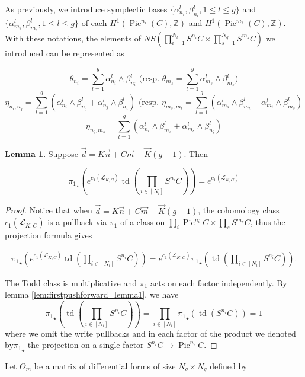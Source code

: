 \documentclass{article}
\theoremstyle{definition}
\newcounter{sharedcounter}[section]
\newtheorem{lemma}[sharedcounter]{Lemma}
\DeclareMathOperator{\pic}{\text{Pic}}
\DeclareMathOperator{\td}{td}
\newcommand{\eqtag}[3][1]{
\begin{equation}
   \label{#3}
	\begin{alignedat}{#1}
	#2
	\end{alignedat}
\end{equation}
}
\renewcommand{\leq}{\leqslant}
\begin{document}
\label{sec:symplectic-basis}
	
    As previously, we introduce symplectic bases $\lbrace \alpha_{n_i}^l,\beta_{n_i}^l,1\leq l\leq g \rbrace$ and $\lbrace {\alpha}_{m_s}^l,{\beta}_{m_s}^l,1\leq l\leq g \rbrace$ of each $H^1(\pic^{n_i}(C),\mathbb{Z})$ and $H^1(\pic^{m_s}(C),\mathbb{Z})$. With these notations, the elements of $NS( \prod_{i=1}^{N_l} S^{n_i} C \times\prod_{s=1}^{N_q} S^{m_s}C)$ we introduced can be represented as

    $$\theta_{n_i}=\sum_{l=1}^g \alpha_{n_i}^l \wedge \beta_{n_i}^l \text{ (resp. }\theta_{m_s}=\sum_{l=1}^g {\alpha}_{m_s}^l \wedge \beta_{m_s}^l)$$
	$$\eta_{n_i,n_j}=\sum_{l=1}^g (\alpha_{n_i}^l \wedge\beta_{n_j}^l +\alpha_{n_j}^l \wedge\beta_{n_i}^l) \text{ (resp. } \eta_{m_s,m_t}=\sum_{l=1}^g ({\alpha}_{m_s}^l \wedge {\beta}_{m_t}^l +{\alpha}_{m_t}^l \wedge {\beta}_{m_s}^l)$$
 	$$\eta_{n_i,m_s}=\sum_{l=1}^g (\alpha_{n_i}^l \wedge {\beta}_{m_s}^l +{\alpha}_{m_s}^l \wedge\beta_{n_i}^l)$$

\begin{lemma}
Suppose $\vec{d}=K\vec{n}+C\vec{m}+\vec{K}(g-1)$. Then 

$${\pi_1}_\star \left(e^{c_1(\mathcal{L}_{K,C})} \td\left(\prod_{i\in [{N_l}]} S^{n_i}C \right)\right)=e^{c_1(\mathcal{L}_{K,C})}$$
    
\end{lemma}

\begin{proof}
Notice that when $\vec{d}=K\vec{n}+C\vec{m}+\vec{K}(g-1)$, the cohomology class $c_1(\mathcal{L}_{K,C})$ is a pullback via $\pi_1$ of a class on $\prod_i \pic^{n_i} C \times \prod_s S^{m_s} C$, thus the projection formula gives 
\eqtag{{\pi_1}_\star \left(e^{c_1(\mathcal{L}_{K,C})} \td\left(\prod_{i\in [{N_l}]} S^{n_i}C \right)\right)=e^{c_1(\mathcal{L}_{K,C})} {\pi_1}_\star \left( \td\left(\prod_{i\in [{N_l}]} S^{n_i}C \right)\right).}{eq:pushforwardp1simple} 
The Todd class is multiplicative and $\pi_1$ acts on each factor independently. By lemma \ref{lem:firstpushforward_lemma1}, we have 
$${\pi_1}_\star \left( \td\left(\prod_{i\in [{N_l}]} S^{n_i}C \right)\right)=\prod_{i\in [{N_l}]}  {\pi_1}_\star \left( \td\left(S^{n_i}C \right)\right)=1
$$ where we omit the write pullbacks and in each factor of the product we denoted by${\pi_1}_\star$ the projection on a single factor $S^{n_i}C\to \pic^{n_i} C$.
\end{proof}



Let $\Theta_m$ be a matrix of differential forms of size ${N_q}\times {N_q}$ defined by 
\end{document}
